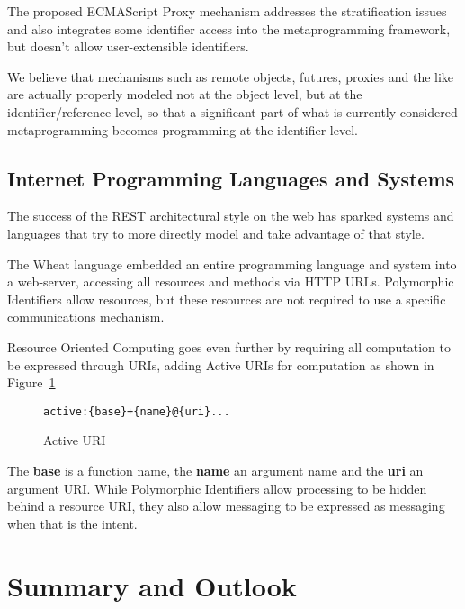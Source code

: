 \documentclass[preprint,authoryear]{acm_proc_article-sp}
\begin{document}
The proposed ECMAScript Proxy mechanism \cite{VanCutsemMiller} addresses
the stratification issues and also integrates some identifier access into the 
metaprogramming framework, but doesn't allow user-extensible identifiers.

We believe that mechanisms such as remote objects, futures, proxies and the like
are actually properly modeled not at the object level, but at the identifier/reference
level, so that a significant part of what is currently considered metaprogramming
becomes programming at the identifier level.

\subsection{Internet Programming Languages and Systems}

The success of the REST architectural style\cite{fielding-rest} on the web has sparked
systems and languages that try to more directly model and take advantage of that
style.

The Wheat language \cite{wheat} embedded an entire programming language
and system into a web-server, accessing all resources and methods via
HTTP URLs.  Polymorphic Identifiers allow resources, but these resources
are not required to use a specific communications mechanism.


Resource Oriented Computing \cite{roc} goes even further by
requiring all computation to be expressed through URIs, adding Active URIs
for computation as shown in Figure~\ref{activeuri}


\begin{figure}[htbp]
\begin{center}
\begin{verbatim}
active:{base}+{name}@{uri}...
\end{verbatim}
\caption{Active URI}
\label{activeuri}
\end{center}
\end{figure}

The {\bf base} is a function name, the {\bf name} an argument name and the
{\bf uri} an argument URI.
 While Polymorphic Identifiers allow processing to be
hidden behind a resource URI, they also allow messaging to be expressed
as messaging when that is the intent.



\section{Summary and Outlook}
\end{document}
